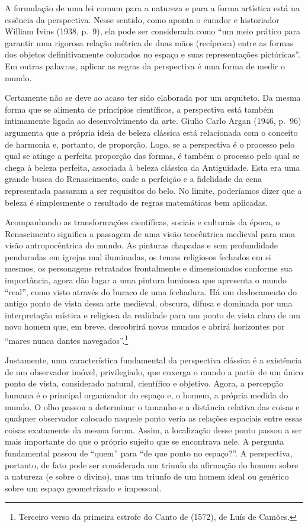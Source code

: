 A formulação de uma lei comum para a natureza e para a forma artística
está na essência da perspectiva. Nesse sentido, como aponta o curador e
historiador William Ivins (1938, p.~9), ela pode ser considerada como
``um meio prático para garantir uma rigorosa relação métrica de duas
mãos (recíproca) entre as formas dos objetos definitivamente colocados
no espaço e suas representações pictóricas''. Em outras palavras,
aplicar as regras da perspectiva é uma forma de medir o mundo.

Certamente não se deve ao acaso ter sido elaborada por um arquiteto. Da
mesma forma que se alimenta de princípios científicos, a perspectiva
está também intimamente ligada ao desenvolvimento da arte. Giulio Carlo
Argan (1946, p.~96) argumenta que a própria ideia de beleza clássica
está relacionada com o conceito de harmonia e, portanto, de proporção.
Logo, se a perspectiva é o processo pelo qual se atinge a perfeita
proporção das formas, é também o processo pelo qual se chega à beleza
perfeita, associada à beleza clássica da Antiguidade. Esta era uma
grande busca do Renascimento, onde a perfeição e a fidelidade da cena
representada passaram a ser requisitos do belo. No limite, poderíamos
dizer que a beleza é simplesmente o resultado de regras matemáticas bem
aplicadas.

Acompanhando as transformações científicas, sociais e culturais da
época, o Renascimento significa a passagem de uma visão teocêntrica
medieval para uma visão antropocêntrica do mundo. As pinturas chapadas e
sem profundidade penduradas em igrejas mal iluminadas, os temas
religiosos fechados em si mesmos, os personagens retratados frontalmente
e dimensionados conforme sua importância, agora dão lugar a uma pintura
luminosa que apresenta o mundo ``real'', como visto através do buraco de
uma fechadura. Há um deslocamento do antigo ponto de vista dessa arte
medieval, obscura, difusa e dominada por uma interpretação mística e
religiosa da realidade para um ponto de vista claro de um novo homem
que, em breve, descobrirá novos mundos e abrirá horizontes por ``mares
nunca dantes navegados''.\footnote{Terceiro verso da primeira estrofe
  do Canto  de {} (1572), de Luís de Camões.}

Justamente, uma característica fundamental da perspectiva clássica é a
existência de um observador imóvel, privilegiado, que enxerga o mundo a
partir de um único ponto de vista, considerado natural, científico e
objetivo. Agora, a percepção humana é o principal organizador do espaço
e, o homem, a própria medida do mundo. O olho passou a determinar o
tamanho e a distância relativa das coisas e qualquer observador colocado
naquele ponto veria as relações espaciais entre essas coisas exatamente
da mesma forma. Assim, a localização desse ponto passou a ser mais
importante do que o próprio sujeito que se encontrava nele. A pergunta
fundamental passou de ``quem'' para ``de que ponto no espaço?''. A
perspectiva, portanto, de fato pode ser considerada um triunfo da
afirmação do homem sobre a natureza (e sobre o divino), mas um triunfo
de um homem ideal ou genérico sobre um espaço geometrizado e impessoal.

